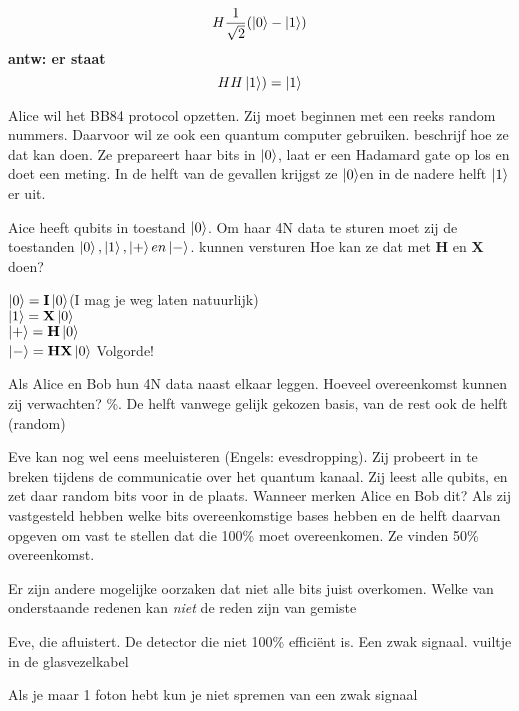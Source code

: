 \documentclass[a4paper, addpoints, 12pt
    , answers    %
    ]{exam}
\newcommand*{\port}[1]{\textbf{#1}}
\begin{document}
\begin{questions}
\[H\frac{1}{\sqrt{2}}(\ket{0}-\ket{1})\]
\ifprintanswers
\textbf{antw:
er staat \[HH\ket{1})=\ket{1}\]
}
\else
\fillwithlines{1in}
\fi


\question[1]
Alice wil het BB84 protocol opzetten. Zij moet beginnen met een reeks random nummers. Daarvoor wil ze ook een quantum computer gebruiken. beschrijf hoe ze dat kan doen.
\ifprintanswers
Ze prepareert haar bits in $\ket{0}$, laat er een Hadamard gate op los en doet een meting. In de helft van de gevallen krijgst ze $\ket{0}$en in de nadere helft $\ket{1}$ er uit.
\else
\fillwithlines{1in}
\fi

\question[1]
Aice heeft qubits in toestand $\ket{0}$. Om haar 4N data te sturen moet zij de toestanden $\ket{0}, \ket{1}, \ket{+} en \ket{-}$. kunnen versturen
Hoe kan ze dat met \port{H} en \port{X} doen?

\ifprintanswers
\else
$\ket{0}=\port{I}\ket{0}$(I mag je weg laten natuurlijk)\\
$\ket{1}=\port{X}\ket{0}$\\
$\ket{+}=\port{H}\ket{0}$\\
$\ket{-}=\port{H}\port{X}\ket{0}$ Volgorde!\\
\fillwithlines{1in}
\fi

\question[1]
Als Alice en Bob hun 4N data naast elkaar leggen. Hoeveel overeenkomst kunnen zij verwachten?
\%. De helft vanwege gelijk gekozen basis, van de rest ook de helft (random)
\else
\fillwithlines{1in}
\fi

Eve kan nog wel eens meeluisteren (Engels: evesdropping).  Zij probeert in te breken tijdens de communicatie over het quantum kanaal. 
Zij leest alle qubits, en zet daar random bits voor in de plaats.
Wanneer merken Alice en Bob dit?
\ifprintanswers
Als zij vastgesteld hebben welke bits overeenkomstige bases hebben en de  helft daarvan opgeven om vast te stellen dat die 100\% moet overeenkomen. Ze vinden 50\% overeenkomst.
\else
\fillwithlines{1in}
\fi

Er zijn andere mogelijke oorzaken dat niet alle bits juist overkomen. Welke van onderstaande redenen kan \textit{niet} de  reden zijn van gemiste

\begin{choices}
\choice Eve, die afluistert.
\choice De detector die niet 100\% effici\"ent is.
\correctchoice Een zwak signaal.
\choice vuiltje in de glasvezelkabel
\end{choices} 
\question[1]
\ifprintanswers
Als je maar 1 foton hebt kun je niet spremen van een zwak signaal
\else
\fillwithlines{1in}
\fi


\end{questions}
\end{document}
